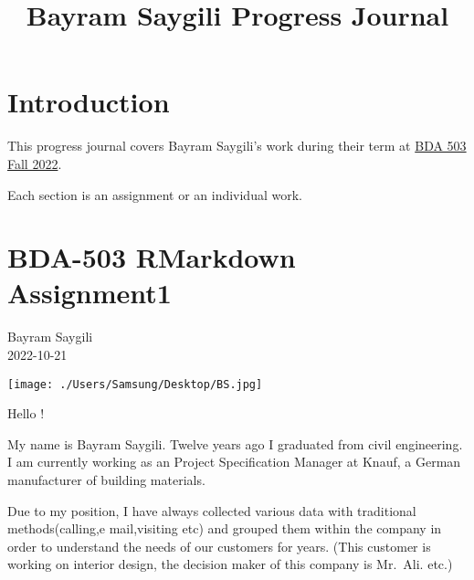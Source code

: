 \documentclass[
  letterpaper,
  DIV=11,
  numbers=noendperiod]{scrreprt}
\title{Bayram Saygili Progress Journal}
\author{}
\date{}
\renewcommand*\contentsname{Table of contents}
\newcommand\contentsname{Table of contents}
\begin{document}
\maketitle
\ifdefined\Shaded\renewenvironment{Shaded}{\begin{tcolorbox}[boxrule=0pt, interior hidden, breakable, borderline west={3pt}{0pt}{shadecolor}, enhanced, frame hidden, sharp corners]}{\end{tcolorbox}}\fi

\renewcommand*\contentsname{Table of contents}
{
\hypersetup{linkcolor=}
\setcounter{tocdepth}{2}
\tableofcontents
}

\hypertarget{introduction}{%
\chapter*{Introduction}\label{introduction}}

This progress journal covers Bayram Saygili's work during their term at
\href{https://mef-bda503.github.io/fall22/}{BDA 503 Fall 2022}.

Each section is an assignment or an individual work.


\hypertarget{bda-503-rmarkdown-assignment1}{%
\chapter{\texorpdfstring{\textbf{BDA-503 RMarkdown
Assignment1}}{BDA-503 RMarkdown Assignment1}}\label{bda-503-rmarkdown-assignment1}}

Bayram Saygili\\
2022-10-21

\hfill\break

\texttt{[image: ./Users/Samsung/Desktop/BS.jpg]}

Hello !

My name is Bayram Saygili. Twelve years ago I graduated from civil
engineering. I am currently working as an Project Specification Manager
at Knauf, a German manufacturer of building materials.

Due to my position, I have always collected various data with
traditional methods(calling,e mail,visiting etc) and grouped them within
the company in order to understand the needs of our customers for years.
(This customer is working on interior design, the decision maker of this
company is Mr.~Ali. etc.)
\end{document}
